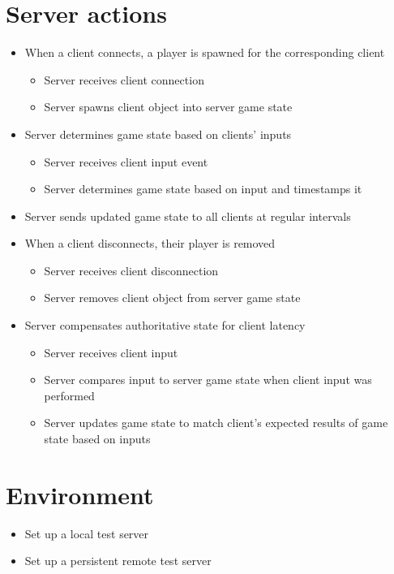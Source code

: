\documentclass{article}
\begin{document}
\section{Server actions}
\begin{itemize}
		\item When a client connects, a player is spawned for the corresponding client
    \begin{itemize}
				\item Server receives client connection
				\item Server spawns client object into server game state
    \end{itemize}
		\item Server determines game state based on clients' inputs
    \begin{itemize}
				\item Server receives client input event
				\item Server determines game state based on input and timestamps it
    \end{itemize}
		\item Server sends updated game state to all clients at regular intervals
		\item When a client disconnects, their player is removed
    \begin{itemize}
			  \item Server receives client disconnection
				\item Server removes client object from server game state
    \end{itemize}
		\item Server compensates authoritative state for client latency
    \begin{itemize}
				\item Server receives client input
				\item Server compares input to server game state when client input was performed
				\item Server updates game state to match client's expected results of game state based on inputs
    \end{itemize}
\end{itemize}

\section{Environment}
\begin{itemize}
		\item Set up a local test server
		\item Set up a persistent remote test server
\end{itemize}
\end{document}
